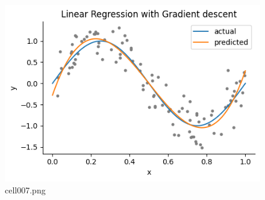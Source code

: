 \begin{figure}[ht]
	\centering
	\includegraphics[scale=0.8, max width=\linewidth]{./fig/introduction/linear-regression/cell007.png}
	\caption{cell007.png}
	\label{cell007.png}
\end{figure}